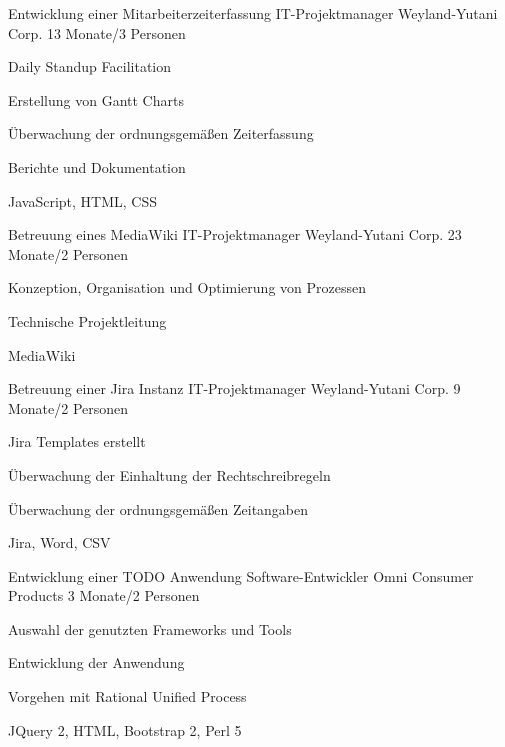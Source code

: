 \documentclass{germanqualificationprofile}
\begin{document}
  \begin{qpprojects}

    \begin{qpproject}
      {Entwicklung einer Mitarbeiterzeiterfassung}
      {}
      {IT-Projektmanager}
      {Weyland-Yutani Corp.}
      {13 Monate/3 Personen}
      {
        \item Daily Standup Facilitation
        \item Erstellung von Gantt Charts
        \item Überwachung der ordnungsgemäßen Zeiterfassung
        \item Berichte und Dokumentation
      }
      {JavaScript, HTML, CSS}
    \end{qpproject}

    \begin{qpproject}
      {Betreuung eines MediaWiki}
      {}
      {IT-Projektmanager}
      {Weyland-Yutani Corp.}
      {23 Monate/2 Personen}
      {
        \item Konzeption, Organisation und Optimierung von Prozessen
        \item Technische Projektleitung
      }
      {MediaWiki}
    \end{qpproject}

    \begin{qpproject}
      {Betreuung einer Jira Instanz}
      {}
      {IT-Projektmanager}
      {Weyland-Yutani Corp.}
      {9 Monate/2 Personen}
      {
        \item Jira Templates erstellt
        \item Überwachung der Einhaltung der Rechtschreibregeln
        \item Überwachung der ordnungsgemäßen Zeitangaben
      }
      {Jira, Word, CSV}
    \end{qpproject}

    \begin{qpproject}
      {Entwicklung einer TODO Anwendung}
      {}
      {Software-Entwickler}
      {Omni Consumer Products}
      {3 Monate/2 Personen}
      {
        \item Auswahl der genutzten Frameworks und Tools
        \item Entwicklung der Anwendung
        \item Vorgehen mit Rational Unified Process
      }
      {JQuery 2, HTML, Bootstrap 2, Perl 5}
    \end{qpproject}

  \end{qpprojects}
\end{document}

